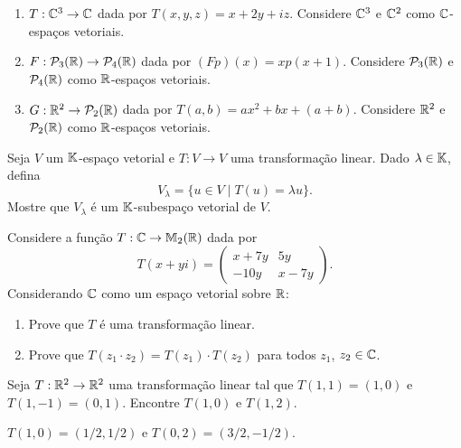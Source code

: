 \documentclass[12pt]{exam}
\begin{document}
\begin{exercicio}
\begin{enumerate}[label={\alph*})]
    \item $T : \mathbb{C}^3 \to \mathbb{C}$ dada por $T(x,y,z) = x + 2y + iz$. Considere $\mathbb{C}^3$ e $\mathbb{C}^2$ como $\mathbb{C}$-espa\c{c}os vetoriais.

    \item $F : \mathcal{P}_3(\mathbb{R}) \to \mathcal{P}_4(\mathbb{R})$ dada por $(Fp)(x) = xp(x + 1)$. Considere $\mathcal{P}_3(\mathbb{R})$ e $\mathcal{P}_4(\mathbb{R})$ como $\mathbb{R}$-espa\c{c}os vetoriais.

    \item $G : \mathbb{R}^2 \to \mathcal{P}_2(\mathbb{R})$ dada por $T(a,b) = ax^2 + bx + (a + b)$. Considere $\mathbb{R}^2$ e $\mathcal{P}_2(\mathbb{R})$ como $\mathbb{R}$-espa\c{c}os vetoriais.
  \end{enumerate}
\end{exercicio}

\begin{exercicio}
  Seja $V$ um $\mathbb{K}$-espa\c{c}o vetorial e $T : V \to V$ uma transforma\c{c}\~ao linear. Dado $\lambda \in \mathbb{K}$, defina
  \[
      V_\lambda = \{ u \in V \mid T(u) = \lambda u\}.
  \]
  Mostre que $V_\lambda$ \'e um $\mathbb{K}$-subespa\c{c}o vetorial de $V$.
\end{exercicio}

\begin{exercicio}
  Considere a fun\c{c}\~ao $T : \mathbb{C} \to \mathbb{M}_2(\mathbb{R})$ dada por
  \[
      T(x + yi) = \begin{pmatrix}
                        x + 7y & 5y\\
                       -10y & x - 7y
                   \end{pmatrix}.
  \]
  Considerando $\mathbb{C}$ como um espa\c{c}o vetorial sobre $\mathbb{R}$:
  \begin{enumerate}[label={\alph*})]
    \item Prove que $T$ \'e uma transforma\c{c}\~ao linear.

    \item Prove que $T(z_1\cdot z_2) = T(z_1)\cdot T(z_2)$ para todos $z_1$, $z_2 \in \mathbb{C}$.
  \end{enumerate}
\end{exercicio}

\begin{exercicio}
  Seja $T : \mathbb{R}^2 \to \mathbb{R}^2$ uma transforma\c{c}\~ao linear tal que $T(1,1) = (1,0)$ e $T(1,-1) = (0,1)$. Encontre $T(1,0)$ e $T(1,2)$.
  \begin{solucao}
    $T(1,0) = (1/2,1/2)$ e $T(0,2) = (3/2,-1/2)$.
  \end{solucao}
\end{exercicio}
\end{document}
